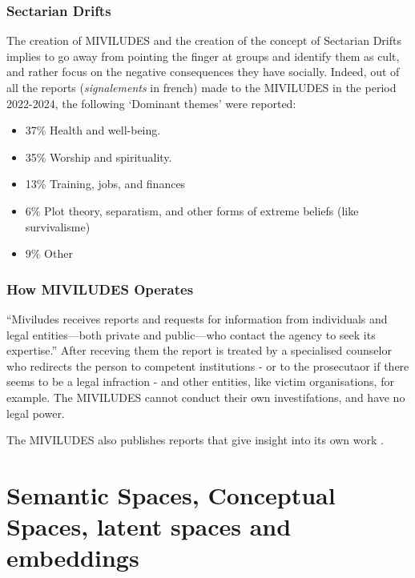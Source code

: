 \subsubsection{Sectarian Drifts}
The creation of MIVILUDES and the creation of the concept of Sectarian Drifts implies to go away from pointing the finger at groups and identify them as cult, and rather focus on the negative consequences they have socially.
Indeed, out of all the reports (\textit{signalements} in french) made to the MIVILUDES in the period 2022-2024, the following `Dominant themes' were reported:

\begin{itemize}
	\item 37\% Health and well-being.
	\item 35\% Worship and spirituality.
	\item 13\% Training, jobs, and finances
	\item 6\% Plot theory, separatism, and other forms of extreme beliefs (like survivalisme)
	\item 9\% Other
\end{itemize}\autocite[pp.8]{missioninterministerielledevigilanceetdeluttecontrelesderivessectairesmiviludesRapportDactiviteMiviludes2024}


\subsubsection{How MIVILUDES Operates}
\enquote{Miviludes receives reports and requests for information from individuals and legal entities—both private and public—who contact the agency to seek its expertise.}\autocite[pp.10]{missioninterministerielledevigilanceetdeluttecontrelesderivessectairesmiviludesRapportDactiviteMiviludes2024}
After receving them the report is treated by a specialised counselor who redirects the person to competent institutions - or to the prosecutaor if there seems to be a legal infraction - and  other entities, like victim organisations, for example. 
The MIVILUDES cannot conduct their own investifations, and have no legal power.


The MIVILUDES also publishes reports that give insight into its own work \autocite{missioninterministerielledevigilanceetdeluttecontrelesderivessectairesmiviludesRapportDactiviteMiviludes2024}.



\section{Semantic Spaces, Conceptual Spaces, latent spaces and embeddings}



